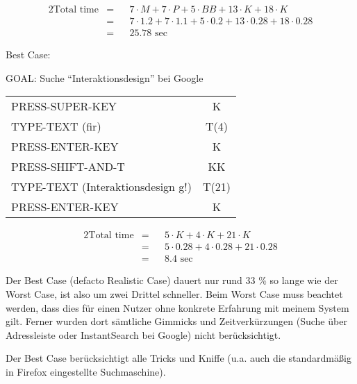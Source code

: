 \documentclass[a4paper,10pt]{scrartcl}
\begin{document}
\begin{alignat*}{2}
\text{Total time} &=&& 7 \cdot M + 7 \cdot P + 5 \cdot BB + 13 \cdot K + 18 \cdot K \\
&=&& 7 \cdot 1.2 + 7 \cdot 1.1 + 5 \cdot 0.2 + 13 \cdot 0.28 + 18 \cdot 0.28 \\
&=&& 25.78 \text{ sec}
\end{alignat*}


Best Case:

GOAL: Suche "`Interaktionsdesign"' bei Google \\
\begin{tabular}{l|c}
	PRESS-SUPER-KEY & K \\
	TYPE-TEXT (fir) & T(4) \\
	PRESS-ENTER-KEY & K \\
	PRESS-SHIFT-AND-T & KK \\
	TYPE-TEXT (Interaktionsdesign g!) & T(21) \\
	PRESS-ENTER-KEY & K
\end{tabular}

\begin{alignat*}{2}
\text{Total time} &=&& 5 \cdot K + 4 \cdot K + 21 \cdot K \\
&=&& 5 \cdot 0.28 + 4 \cdot 0.28 + 21 \cdot 0.28  \\
&=&& 8.4 \text{ sec}
\end{alignat*}

Der Best Case (defacto Realistic Case) dauert nur rund 33 \% so lange wie der Worst Case, ist also um zwei Drittel schneller. Beim Worst Case muss beachtet werden, dass dies für einen Nutzer ohne konkrete Erfahrung mit meinem System gilt. Ferner wurden dort sämtliche Gimmicks und Zeitverkürzungen (Suche über Adressleiste oder InstantSearch bei Google) nicht berücksichtigt.

Der Best Case berücksichtigt alle Tricks und Kniffe (u.a. auch die standardmäßig in Firefox eingestellte Suchmaschine).
\end{document}
